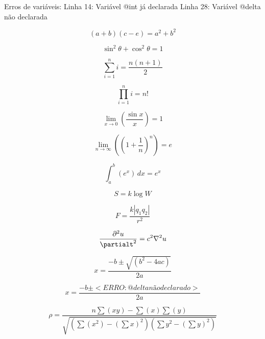 Erros de variáveis:
Linha 14: Variável @int já declarada
Linha 28: Variável @delta não declarada

$$\left(a+b\right)\left(c-e\right)=a^2+b^2$$

$$\sin^{2} \theta+\cos^{2} \theta=1$$

$$\sum_{i=1}^{n} i=\frac{n\left(n+1\right)}{2}$$

$$\prod_{i=1}^{n} i=n!$$

$$\lim_{x \to 0} (\frac{\sin x}{x})=1$$

$$\lim_{n \to \infty} (\left(1+\frac{1}{n}\right)^n)=e$$

$$\int_{a}^{b} (e^x) \, dx=e^x$$

$$S=k\log W$$

$$F=\frac{k\left|q_{1}q_{2}\right|}{r^2}$$

$$\frac{\partial^{2} u}{\partialt^{2}}=c^2\nabla^2u$$

$$x=\frac{-b\pm \sqrt{(b^2-4ac)}}{2a}$$

$$x=\frac{-b\pm <ERRO: @delta não declarado>}{2a}$$

$$\rho=\frac{n\sum (xy)-\sum (x)\sum (y)}{\sqrt{\left(\sum (x^2)-\left(\sum x\right)^2\right)\left(\sum y^2-\left(\sum y\right)^2\right)}}$$

